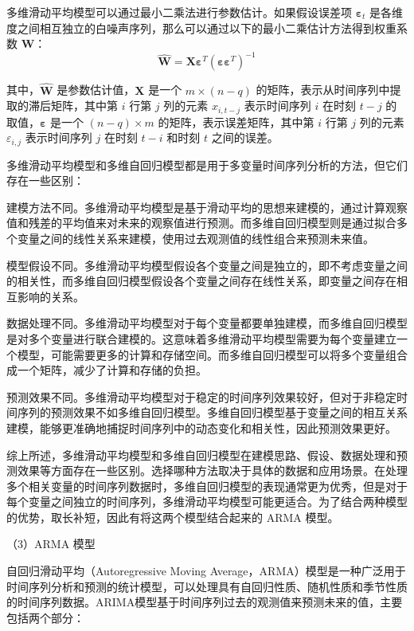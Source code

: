 \documentclass[master]{thesis-uestc}
\begin{document}
多维滑动平均模型可以通过最小二乘法进行参数估计。如果假设误差项 $\boldsymbol{\varepsilon}_{t}$ 是各维度之间相互独立的白噪声序列，那么可以通过以下的最小二乘估计方法得到权重系数 $\boldsymbol{W}$：
\begin{equation}
    \hat{\boldsymbol{W}} = \boldsymbol{X}\boldsymbol{\varepsilon}^{T}(\boldsymbol{\varepsilon}\boldsymbol{\varepsilon}^{T})^{-1}
\end{equation}

其中，$\hat{\boldsymbol{W}}$ 是参数估计值，$\boldsymbol{X}$ 是一个 $m \times (n-q)$ 的矩阵，表示从时间序列中提取的滞后矩阵，其中第 $i$ 行第 $j$ 列的元素 $x_{i,t-j}$ 表示时间序列 $i$ 在时刻 $t-j$ 的取值，$\boldsymbol{\varepsilon}$ 是一个 $(n-q) \times m$ 的矩阵，表示误差矩阵，其中第 $i$ 行第 $j$ 列的元素 $\varepsilon_{i,j}$ 表示时间序列 $j$ 在时刻 $t-i$ 和时刻 $t$ 之间的误差。

多维滑动平均模型和多维自回归模型都是用于多变量时间序列分析的方法，但它们存在一些区别：

建模方法不同。多维滑动平均模型是基于滑动平均的思想来建模的，通过计算观察值和残差的平均值来对未来的观察值进行预测。而多维自回归模型则是通过拟合多个变量之间的线性关系来建模，使用过去观测值的线性组合来预测未来值。

模型假设不同。多维滑动平均模型假设各个变量之间是独立的，即不考虑变量之间的相关性，而多维自回归模型假设各个变量之间存在线性关系，即变量之间存在相互影响的关系。

数据处理不同。多维滑动平均模型对于每个变量都要单独建模，而多维自回归模型是对多个变量进行联合建模的。这意味着多维滑动平均模型需要为每个变量建立一个模型，可能需要更多的计算和存储空间。而多维自回归模型可以将多个变量组合成一个矩阵，减少了计算和存储的负担。

预测效果不同。多维滑动平均模型对于稳定的时间序列效果较好，但对于非稳定时间序列的预测效果不如多维自回归模型。多维自回归模型基于变量之间的相互关系建模，能够更准确地捕捉时间序列中的动态变化和相关性，因此预测效果更好。

综上所述，多维滑动平均模型和多维自回归模型在建模思路、假设、数据处理和预测效果等方面存在一些区别。选择哪种方法取决于具体的数据和应用场景。在处理多个相关变量的时间序列数据时，多维自回归模型的表现通常更为优秀，但是对于每个变量之间独立的时间序列，多维滑动平均模型可能更适合。为了结合两种模型的优势，取长补短，因此有将这两个模型结合起来的 ARMA 模型。

（3）ARMA 模型

自回归滑动平均（Autoregressive Moving Average，ARMA）模型是一种广泛用于时间序列分析和预测的统计模型，可以处理具有自回归性质、随机性质和季节性质的时间序列数据。ARIMA模型基于时间序列过去的观测值来预测未来的值，主要包括两个部分：
\end{document}
